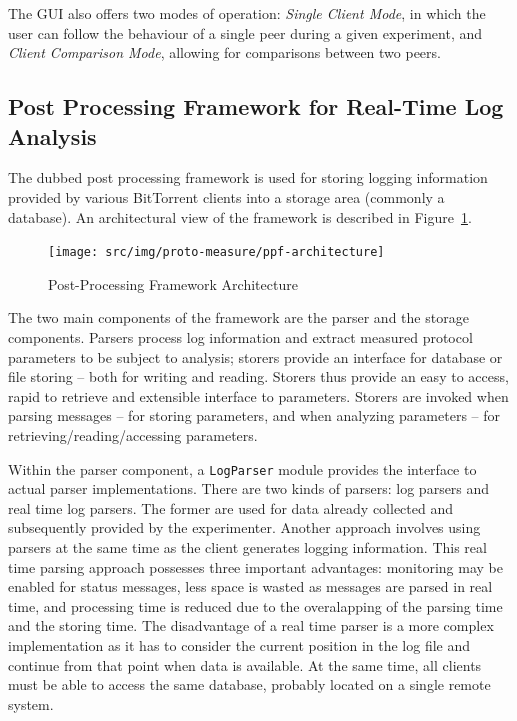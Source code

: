 The GUI also offers two modes of operation: \textit{Single Client Mode},
in which the user can follow the behaviour of a single peer during a given
experiment, and \textit{Client Comparison Mode}, allowing for comparisons
between two peers.

\subsection{Post Processing Framework for Real-Time Log Analysis}

The dubbed post processing framework is used for storing logging information
provided by various BitTorrent clients into a storage area (commonly a
database). An architectural view of the framework is described in
Figure~\ref{fig:proto-measure:ppf-architecture}.

\begin{figure}[h]
  \begin{center}
    \texttt{[image: src/img/proto-measure/ppf-architecture]}
  \end{center}
  \caption{Post-Processing Framework Architecture}
  \label{fig:proto-measure:ppf-architecture}
\end{figure}

The two main components of the framework are the parser and the storage
components. Parsers process log information and extract measured protocol
parameters to be subject to analysis; storers provide an interface for
database or file storing -- both for writing and reading. Storers thus provide
an easy to access, rapid to retrieve and extensible interface to parameters.
Storers are invoked when parsing messages -- for storing parameters, and when
analyzing parameters -- for retrieving/reading/accessing parameters.

Within the parser component, a \texttt{LogParser} module provides the
interface to actual parser implementations. There are two kinds of parsers:
log parsers and real time log parsers. The former are used for data already
collected and subsequently provided by the experimenter. Another approach
involves using parsers at the same time as the client generates logging
information. This real time parsing approach possesses three important
advantages: monitoring may be enabled for status messages, less space is
wasted as messages are parsed in real time, and processing time is reduced due
to the overalapping of the parsing time and the storing time. The disadvantage
of a real time parser is a more complex implementation as it has to consider
the current position in the log file and continue from that point when data is
available. At the same time, all clients must be able to access the same
database, probably located on a single remote system.

